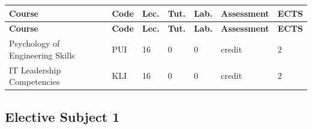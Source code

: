 \documentclass[12pt,a4paper]{article}
\newcommand{\thdrule}{\noalign{\global\setlength{\extrarowheight}{0pt}}}
\newcommand{\thdend}{\noalign{\global\setlength{\extrarowheight}{4pt}}}
\begin{document}
{\scriptsize
\begin{longtable}{m{5.5cm}m{0.8cm}m{1cm}m{1cm}m{1cm}m{1.7cm}m{0.7cm}}
\thdrule\toprule
\rowcolor{pjatkRed}
{\color{white}\footnotesize\textbf{\vphantom{Ag}Course}} & {\color{white}\footnotesize\textbf{\vphantom{Ag}Code}} & {\color{white}\footnotesize\textbf{\vphantom{Ag}Lec.}} & {\color{white}\footnotesize\textbf{\vphantom{Ag}Tut.}} & {\color{white}\footnotesize\textbf{\vphantom{Ag}Lab.}} & {\color{white}\footnotesize\textbf{\vphantom{Ag}Assessment}} & {\color{white}\footnotesize\textbf{\vphantom{Ag}ECTS}} \\
\midrule\thdend
\endfirsthead
\thdrule\toprule
\rowcolor{pjatkRed}
{\color{white}\footnotesize\textbf{\vphantom{Ag}Course}} & {\color{white}\footnotesize\textbf{\vphantom{Ag}Code}} & {\color{white}\footnotesize\textbf{\vphantom{Ag}Lec.}} & {\color{white}\footnotesize\textbf{\vphantom{Ag}Tut.}} & {\color{white}\footnotesize\textbf{\vphantom{Ag}Lab.}} & {\color{white}\footnotesize\textbf{\vphantom{Ag}Assessment}} & {\color{white}\footnotesize\textbf{\vphantom{Ag}ECTS}} \\
\midrule\thdend
\endhead
\rowcolor{tableRowLight} Psychology of Engineering Skills & PUI & 16 & 0 & 0 & {\scriptsize credit} & 2 \\
\rowcolor{tableRowAlt} IT Leadership Competencies & KLI & 16 & 0 & 0 & {\scriptsize credit} & 2 \\
\bottomrule
\end{longtable}}

\subsection*{Elective Subject 1}
\end{document}
